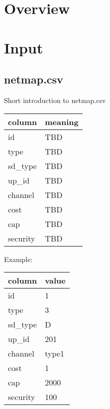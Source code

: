 \documentclass[12pt]{article}
\begin{document}
\tableofcontents

\newpage

\section{Overview}

\section{Input}

\subsection{netmap.csv}

Short introduction to netmap.csv \\

\noindent
\begin{tabular} {| l | l |}
    \hline
    \textbf{column} & \textbf{meaning} \\ \hline
    id & TBD \\ \hline
    type & TBD \\ \hline
    sd\_type & TBD \\ \hline
    up\_id & TBD \\ \hline
    channel & TBD \\ \hline
    cost & TBD \\ \hline
    cap & TBD \\ \hline
    security & TBD \\ \hline
\end{tabular}

\bigskip
\noindent
Example:

\bigskip
\noindent
\begin{tabular} {| l | l |}
    \hline
    \textbf{column} & \textbf{value} \\ \hline
    id & 1 \\ \hline
    type & 3 \\ \hline
    sd\_type & D \\ \hline
    up\_id & 201 \\ \hline
    channel & type1 \\ \hline
    cost & 1 \\ \hline
    cap & 2000 \\ \hline
    security & 100 \\ \hline
\end{tabular}
\end{document}
